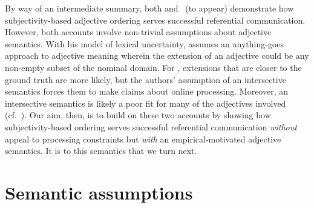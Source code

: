 \documentclass[10pt,a4paper]{article}
\begin{document}
By way of an intermediate summary, both  and \citeauthor{scontrasetalSPadjectives}~(to appear) demonstrate how subjectivity-based adjective ordering serves successful referential communication. However, both accounts involve non-trivial assumptions about adjective semantics. With his model of lexical uncertainty, \citeauthor{simonic2018} assumes an anything-goes approach to adjective meaning wherein the extension of an adjective could be any non-empty subset of the nominal domain. For \citeauthor{scontrasetalSPadjectives}, extensions that are closer to the ground truth are more likely, but the authors' assumption of an intersective semantics forces them to make claims about online processing. Moreover, an intersective semantics is likely a poor fit for many of the adjectives involved (cf.~). Our aim, then, is to build on these two accounts by showing how subjectivity-based ordering serves successful referential communication \emph{without} appeal to processing constraints but \emph{with} an empirical-motivated adjective semantics. It is to this semantics that we turn next.

\section{Semantic assumptions}

\end{document}
